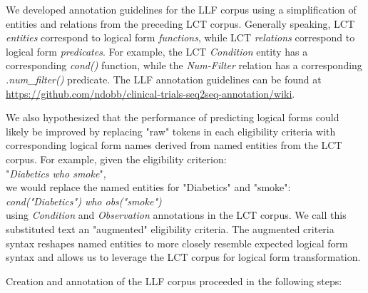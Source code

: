 \documentclass[../main.tex]{subfiles}
\begin{document}
We developed annotation guidelines for the LLF corpus using a simplification of entities and relations from the preceding LCT corpus\cite{dobbins2022leaf}. Generally speaking, LCT \textit{entities} correspond to logical form \textit{functions}, while LCT \textit{relations} correspond to logical form \textit{predicates}. For example, the LCT \textit{Condition} entity has a corresponding \textit{cond()} function, while the \textit{Num-Filter} relation has a corresponding \textit{.num\_filter()} predicate. The LLF annotation guidelines can be found at \url{https://github.com/ndobb/clinical-trials-seq2seq-annotation/wiki}.

We also hypothesized that the performance of predicting logical forms could likely be improved by replacing "raw" tokens in each eligibility criteria with corresponding logical form names derived from named entities from the LCT corpus. For example, given the eligibility criterion: \\

"\textit{Diabetics who smoke}", \\

\noindent we would replace the named entities for "Diabetics" and "smoke": \\ 

\textit{cond("Diabetics") who obs("smoke")} \\

\noindent using \textit{Condition} and \textit{Observation} annotations in the LCT corpus. We call this substituted text an "augmented" eligibility criteria. The augmented criteria syntax reshapes named entities to more closely resemble expected logical form syntax and allows us to leverage the LCT corpus for logical form transformation.

Creation and annotation of the LLF corpus proceeded in the following steps:
\end{document}
